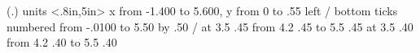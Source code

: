\documentclass{book}
\begin{document}
\beginpicture
  \tenrm
    \setplotsymbol ({\eightrm .})
  \setcoordinatesystem units <.8in,5in>
  \setplotarea x from -1.400 to 5.600, y from 0 to .55 
  \axis left 
  /
  \axis bottom
   ticks
    numbered from -.0100 to 5.50 by .50 
  /
\setdashpattern <2pt,2pt,2pt,3pt>
 \twelverm
  at 3.5 .45
 \putrule from 4.2 .45 to 5.5 .45
\setdashpattern <1pt,3pt,4pt,3pt>
  at 3.5 .40
 \putrule from 4.2 .40 to 5.5 .40
\endpicture
\end{document}
